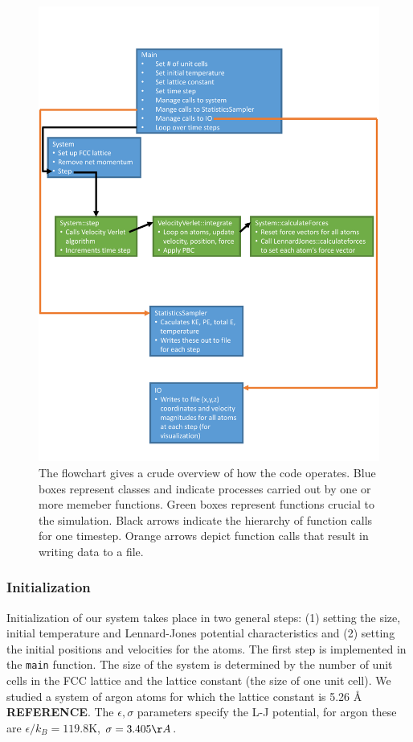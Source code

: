 \documentclass[10pt,showpacs,preprintnumbers,footinbib,amsmath,amssymb,aps,prl,twocolumn,groupedaddress,superscriptaddress,showkeys]{revtex4-1}
\begin{document}
\begin{figure}
	\includegraphics[width=\textwidth]{figures/flowchart.pdf}
	\caption{The flowchart gives a crude overview of how the
	code operates. Blue boxes represent classes and
	indicate processes carried out by one or more memeber
	functions. Green boxes represent functions crucial to the 
	simulation. Black arrows indicate the hierarchy of function
	calls for one timestep. Orange arrows depict function
	calls that result in writing data to a file.}
	\label{fig:flowchart}
\end{figure}
	

\subsubsection*{Initialization}

Initialization of our system takes place in two general steps: (1)
setting the size, initial temperature and Lennard-Jones potential
characteristics and (2) setting the initial positions and velocities
for the atoms. The first step is implemented in the \texttt{main}
function. The size of the system is determined by the number of
unit cells in the FCC lattice and the lattice constant (the size of
one unit cell). We studied a system of argon atoms for which
the lattice constant is 5.26 {\AA} \textbf{REFERENCE}. The
$\epsilon,\sigma$ parameters specify the L-J potential, for argon
these are $\epsilon / k_B = 119.8\mathrm{K}$, $ \sigma=3.405
{\AA}$.
\end{document}
